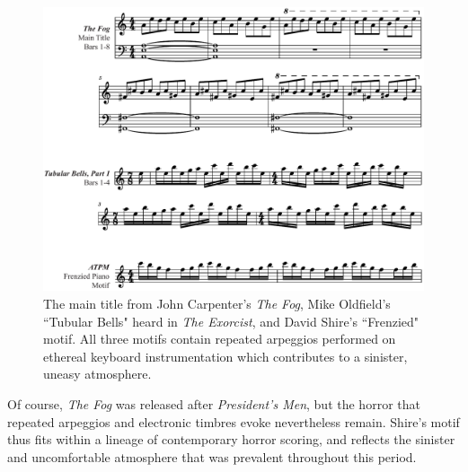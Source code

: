 \begin{figure}
    \centering
    \includegraphics[width=1\linewidth]{img/president-horror-synth.pdf}
    \caption{The main title from John Carpenter's \textit{The Fog}, Mike Oldfield's ``Tubular Bells" heard in \textit{The Exorcist}, and David Shire's ``Frenzied" motif. All three motifs contain repeated arpeggios performed on ethereal keyboard instrumentation which contributes to a sinister, uneasy atmosphere.}
    \label{fig:president-horror-synth}
\end{figure}
Of course, \textit{The Fog} was released after \textit{President's Men}, but the horror that repeated arpeggios and electronic timbres evoke nevertheless remain.
Shire's motif thus fits within a lineage of contemporary horror scoring, and reflects the sinister and uncomfortable atmosphere that was prevalent throughout this period.

